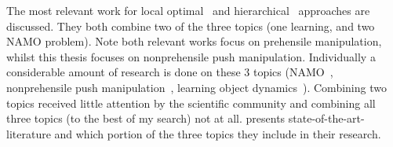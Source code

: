 The most relevant work for local optimal~\cite{sabbaghnovin_model_2021} and hierarchical~\cite{scholz_navigation_2016} approaches are discussed. They both combine two of the three topics (one learning, and two \ac{NAMO} problem). Note both relevant works focus on prehensile manipulation, whilst this thesis focuses on nonprehensile push manipulation. Individually a considerable amount of research is done on these 3 topics (\ac{NAMO}~\cite{chen_fast_2018,elbanhawi_samplingbased_2014,ellis_navigation_2022,kingston_samplingbased_2018,lavalle_planning_2006,wang_affordancebased_2020}, nonprehensile push manipulation~\cite{arruda_uncertainty_2017,bauza_dataefficient_2018,mericli_pushmanipulation_2015,stuber_featurebased_2018,stuber_let_2020,toussaint_sequenceofconstraints_2022}, learning object dynamics~\cite{cong_selfadapting_2020,seegmiller_vehicle_2013}).
Combining two topics received little attention by the scientific community and combining all three topics (to the best of my search) not at all.  presents state-of-the-art-literature and which portion of the three topics they include in their research.\bs

